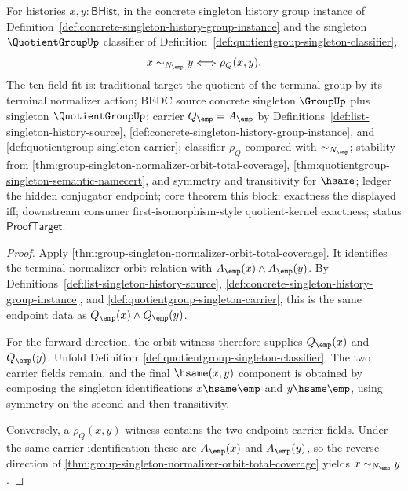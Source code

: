 \begin{theorem}
\label{thm:quotientgroup-singleton-normalizer-orbit-classifier-collapse}
For histories $x,y:\mathsf{BHist}$, in the concrete singleton history group
instance of
Definition~\ref{def:concrete-singleton-history-group-instance} and the
singleton $\QuotientGroupUp$ classifier of
Definition~\ref{def:quotientgroup-singleton-classifier},
$$
x\sim_{N_{\emp}}y \Longleftrightarrow \rho_Q(x,y).
$$
The ten-field fit is: traditional target the quotient of the terminal group by
its terminal normalizer action; BEDC source concrete singleton $\GroupUp$ plus
singleton $\QuotientGroupUp$; carrier $Q_{\emp}=A_{\emp}$ by
Definitions~\ref{def:list-singleton-history-source},
\ref{def:concrete-singleton-history-group-instance}, and
\ref{def:quotientgroup-singleton-carrier}; classifier $\rho_Q$ compared with
$\sim_{N_{\emp}}$; stability from
\autoref{thm:group-singleton-normalizer-orbit-total-coverage},
\autoref{thm:quotientgroup-singleton-semantic-namecert}, and symmetry and
transitivity for $\hsame$; ledger the hidden conjugator endpoint; core theorem
this block; exactness the displayed iff; downstream consumer
first-isomorphism-style quotient-kernel exactness; status
$\mathsf{ProofTarget}$.
\end{theorem}
\begin{proof}
Apply
\autoref{thm:group-singleton-normalizer-orbit-total-coverage}. It identifies
the terminal normalizer orbit relation with
$A_{\emp}(x)\land A_{\emp}(y)$. By
Definitions~\ref{def:list-singleton-history-source},
\ref{def:concrete-singleton-history-group-instance}, and
\ref{def:quotientgroup-singleton-carrier}, this is the same endpoint data as
$Q_{\emp}(x)\land Q_{\emp}(y)$.

For the forward direction, the orbit witness therefore supplies
$Q_{\emp}(x)$ and $Q_{\emp}(y)$. Unfold
Definition~\ref{def:quotientgroup-singleton-classifier}. The two carrier
fields remain, and the final $\hsame(x,y)$ component is obtained by composing
the singleton identifications $x\hsame\emp$ and $y\hsame\emp$, using symmetry
on the second and then transitivity.

Conversely, a $\rho_Q(x,y)$ witness contains the two endpoint carrier fields.
Under the same carrier identification these are
$A_{\emp}(x)$ and $A_{\emp}(y)$, so the reverse direction of
\autoref{thm:group-singleton-normalizer-orbit-total-coverage} yields
$x\sim_{N_{\emp}}y$.
\end{proof}

